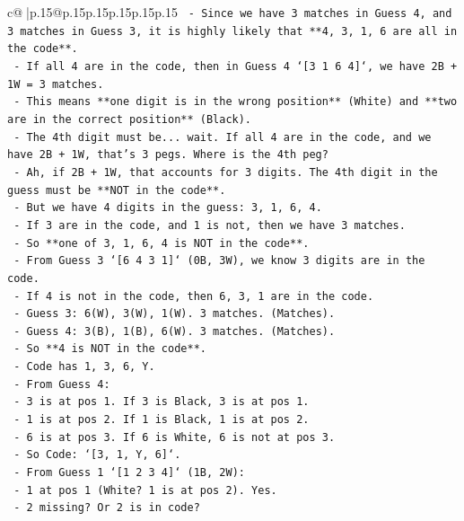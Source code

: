 \documentclass{article}
\begin{document}
{\begin{supertabular}{c@{$\;$}|p{.15\linewidth}@{}p{.15\linewidth}p{.15\linewidth}p{.15\linewidth}p{.15\linewidth}p{.15\linewidth}}
{{{\texttt{    {-} Since we have 3 matches in Guess 4, and 3 matches in Guess 3, it is highly likely that **4, 3, 1, 6 are all in the code**.} \\
\texttt{    {-} If all 4 are in the code, then in Guess 4 `{[}3 1 6 4{]}`, we have 2B + 1W = 3 matches.} \\
\texttt{    {-} This means **one digit is in the wrong position** (White) and **two are in the correct position** (Black).} \\
\texttt{    {-} The 4th digit must be... wait. If all 4 are in the code, and we have 2B + 1W, that's 3 pegs. Where is the 4th peg?} \\
\texttt{    {-} Ah, if 2B + 1W, that accounts for 3 digits. The 4th digit in the guess must be **NOT in the code**.} \\
\texttt{    {-} But we have 4 digits in the guess: 3, 1, 6, 4.} \\
\texttt{    {-} If 3 are in the code, and 1 is not, then we have 3 matches.} \\
\texttt{    {-} So **one of 3, 1, 6, 4 is NOT in the code**.} \\
\texttt{    {-} From Guess 3 `{[}6 4 3 1{]}` (0B, 3W), we know 3 digits are in the code.} \\
\texttt{    {-} If 4 is not in the code, then 6, 3, 1 are in the code.} \\
\texttt{      {-} Guess 3: 6(W), 3(W), 1(W). 3 matches. (Matches).} \\
\texttt{      {-} Guess 4: 3(B), 1(B), 6(W). 3 matches. (Matches).} \\
\texttt{      {-} So **4 is NOT in the code**.} \\
\texttt{      {-} Code has 1, 3, 6, Y.} \\
\texttt{      {-} From Guess 4:} \\
\texttt{        {-} 3 is at pos 1. If 3 is Black, 3 is at pos 1.} \\
\texttt{        {-} 1 is at pos 2. If 1 is Black, 1 is at pos 2.} \\
\texttt{        {-} 6 is at pos 3. If 6 is White, 6 is not at pos 3.} \\
\texttt{      {-} So Code: `{[}3, 1, Y, 6{]}`.} \\
\texttt{      {-} From Guess 1 `{[}1 2 3 4{]}` (1B, 2W):} \\
\texttt{        {-} 1 at pos 1 (White? 1 is at pos 2). Yes.} \\
\texttt{        {-} 2 missing? Or 2 is in code?} \\
}}}
\end{supertabular}}
\end{document}
